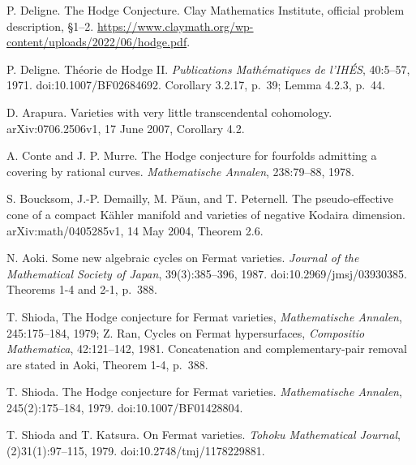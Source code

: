 
P. Deligne.
\newblock The Hodge Conjecture.
\newblock Clay Mathematics Institute, official problem description, \S1--2.
\newblock \url{https://www.claymath.org/wp-content/uploads/2022/06/hodge.pdf}.

P. Deligne.
\newblock Th\'eorie de Hodge II.
\newblock \emph{Publications Math\'ematiques de l'IH\'ES}, 40:5--57, 1971.
\newblock doi:10.1007/BF02684692.
\newblock Corollary 3.2.17, p.~39; Lemma 4.2.3, p.~44.

D. Arapura.
\newblock Varieties with very little transcendental cohomology.
\newblock arXiv:0706.2506v1, 17 June 2007, Corollary 4.2.

A. Conte and J. P. Murre.
\newblock The Hodge conjecture for fourfolds admitting a covering by rational curves.
\newblock \emph{Mathematische Annalen}, 238:79--88, 1978.

S. Boucksom, J.-P. Demailly, M. P\u{a}un, and T. Peternell.
\newblock The pseudo-effective cone of a compact K\"ahler manifold and varieties of negative Kodaira dimension.
\newblock arXiv:math/0405285v1, 14 May 2004, Theorem 2.6.

N. Aoki.
\newblock Some new algebraic cycles on Fermat varieties.
\newblock \emph{Journal of the Mathematical Society of Japan}, 39(3):385--396, 1987.
\newblock doi:10.2969/jmsj/03930385.
\newblock Theorems 1-4 and 2-1, p.~388.

T. Shioda, The Hodge conjecture for Fermat varieties,
\emph{Mathematische Annalen}, 245:175--184, 1979;
Z. Ran, Cycles on Fermat hypersurfaces,
\emph{Compositio Mathematica}, 42:121--142, 1981.
\newblock Concatenation and complementary-pair removal are stated in
Aoki, Theorem 1-4, p.~388.

T. Shioda.
\newblock The Hodge conjecture for Fermat varieties.
\newblock \emph{Mathematische Annalen}, 245(2):175--184, 1979.
\newblock doi:10.1007/BF01428804.

T. Shioda and T. Katsura.
\newblock On Fermat varieties.
\newblock \emph{Tohoku Mathematical Journal}, (2)31(1):97--115, 1979.
\newblock doi:10.2748/tmj/1178229881.

